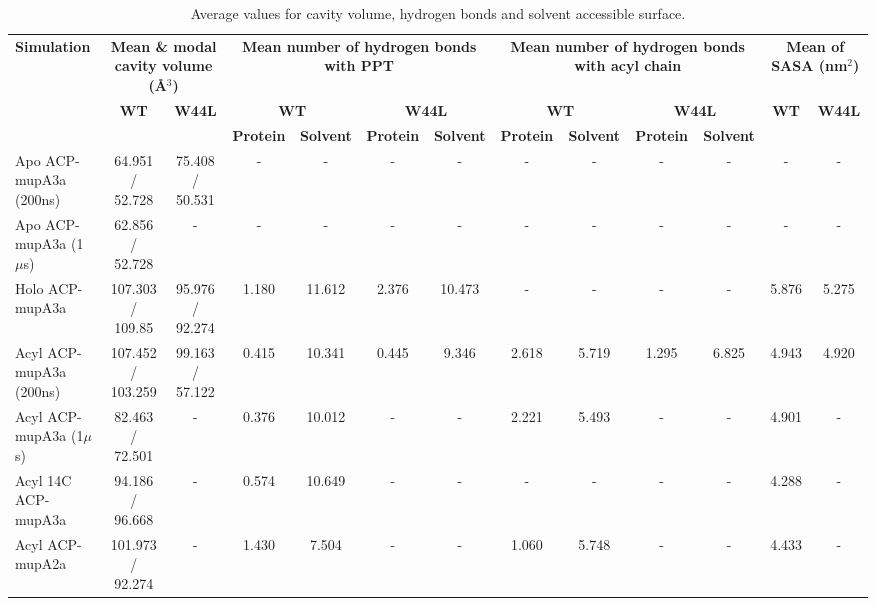 	\begin{table}
	\begin{small}
	\caption{Average values for cavity volume, hydrogen bonds and solvent accessible surface.}
	\label{tab:averages} 
	\begin{tabular}{p{3cm}|cc|cccc|cccc|cc}
	\toprule[2pt]
	\textbf{Simulation} & \multicolumn{ 2}{m{5cm}|}{\textbf{Mean \& modal cavity volume (\AA$ ^{3} $)}} & \multicolumn{ 4}{m{5cm}|}{\textbf{Mean number of hydrogen bonds with PPT}} & \multicolumn{ 4}{m{5cm}|}{\textbf{Mean number of hydrogen bonds with acyl chain}} & \multicolumn{ 2}{m{3cm}}{\textbf{Mean of SASA (nm$ ^{2} $)}} \\
	
	& \multicolumn{1}{c}{\textbf{WT}} & \multicolumn{1}{c|}{\textbf{W44L}} & \multicolumn{ 2}{c}{\textbf{WT}} & \multicolumn{ 2}{c|}{\textbf{W44L}} & \multicolumn{ 2}{c}{\textbf{WT}} & \multicolumn{ 2}{c|}{\textbf{W44L}} & \multicolumn{ 1}{c}{\textbf{WT}} & \multicolumn{ 1}{c}{\textbf{W44L}} \\  

	
	&  &  & \multicolumn{1}{p{1cm}}{\textbf{Protein}} & \multicolumn{1}{p{1cm}}{\textbf{Solvent}} & \multicolumn{1}{p{1cm}}{\textbf{Protein}} & \multicolumn{1}{p{1cm}|}{\textbf{Solvent}} & \multicolumn{1}{p{1cm}}{\textbf{Protein}} & \multicolumn{1}{p{1cm}}{\textbf{Solvent}} & \multicolumn{1}{p{1cm}}{\textbf{Protein}} & \multicolumn{1}{p{1cm}|}{\textbf{Solvent}} &  &  \\ 
	
	\midrule[1pt]
	Apo ACP-mupA3a (200ns) & 64.951 / 52.728 & 75.408 / 50.531 & - & - & - & - & - & - & - & - & - & - \\ 
	Apo ACP-mupA3a (1 $ \mu $s) & 62.856 / 52.728 & - & - & - & - & - & - & - & - & - & - & - \\ 
	Holo ACP-mupA3a & 107.303 / 109.85 & 95.976 / 92.274 & 1.180 & 11.612 & 2.376 & 10.473 & - & - & - & - & 5.876 & 5.275 \\ 
	Acyl ACP-mupA3a (200ns) & 107.452 / 103.259 & 99.163 / 57.122 & 0.415 & 10.341 & 0.445 & 9.346 & 2.618 & 5.719 & 1.295 & 6.825 & 4.943 & 4.920 \\ 
	Acyl ACP-mupA3a (1$ \mu $s) & 82.463 / 72.501 & - & 0.376 & 10.012 & - & - & 2.221 & 5.493 & - & - & 4.901 & - \\ 
	Acyl 14C ACP-mupA3a & 94.186 / 96.668 & - & 0.574 & 10.649 & - & - & - & - & - & - & 4.288 & - \\ 
	Acyl ACP-mupA2a & 101.973 / 92.274 & - & 1.430 & 7.504 & - & - & 1.060 & 5.748 & - & - & 4.433 & - \\ 
	\bottomrule[2pt]
	\end{tabular}
	\end{small}
	\end{table}
		
